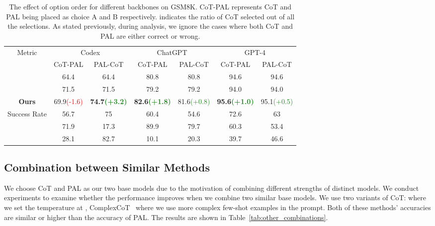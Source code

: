 \documentclass[11pt]{article}
\begin{document}
\begin{table*}[ht]
    \centering
    \small
    \begin{tabular}{c|cc|cc|cc}
    \toprule
         \multirow{2}{*}{Metric} & \multicolumn{2}{c|}{Codex} & \multicolumn{2}{c|}{ChatGPT} & \multicolumn{2}{c}{GPT-4}\\
         & CoT-PAL & PAL-CoT & CoT-PAL & PAL-CoT & CoT-PAL & PAL-CoT\\
         \midrule
 & 64.4 & 64.4 & 80.8 & 80.8 & 94.6 & 94.6\\
          & 71.5 & 71.5 & 79.2 & 79.2 & 94.0 & 94.0\\
         \textbf{Ours} & 69.9\textcolor{red}{(-1.6)} & \textbf{74.7\textcolor{ForestGreen}{(+3.2)}} & \textbf{82.6\textcolor{ForestGreen}{(+1.8)}} & 81.6\textcolor{ForestGreen}{(+0.8)} & \textbf{95.6\textcolor{ForestGreen}{(+1.0)}} & 95.1\textcolor{ForestGreen}{(+0.5)}\\
         Success Rate & 56.7 & 75 & 60.4 & 54.6 & 72.6 & 63 \\
          & 71.9 & 17.3 & 89.9 & 79.7 & 60.3 & 53.4 \\
          & 28.1 & 82.7 & 10.1 & 20.3 & 39.7 & 46.6 \\
         \bottomrule
    \end{tabular}
    \caption{The effect of option order for different backbones on GSM8K. CoT-PAL represents CoT and PAL being placed as choice A and B respectively.  indicates the ratio of CoT selected out of all the selections. As stated previously, during analysis, we ignore the cases where both CoT and PAL are either correct or wrong.}
    \label{tab:order_effect}
\end{table*}

\subsection{Combination between Similar Methods}

We choose CoT and PAL as our two base models due to the motivation of combining different strengths of distinct models. We conduct experiments to examine whether the performance improves when we combine two similar base models. We use two variants of CoT:  where we set the temperature at , ComplexCoT~\citep{Fu2022ComplexityBasedPF} where we use more complex few-shot examples in the prompt. Both of these methods' accuracies are similar or higher than the accuracy of PAL. The results are shown in Table~\ref{tab:other_combinations}. 
\end{document}
